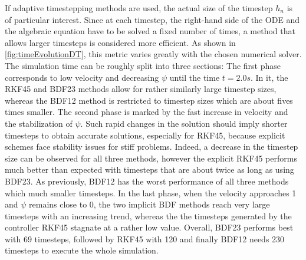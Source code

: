 \documentclass{report}
\begin{document}
If adaptive timestepping methods are used, the actual size of the timestep $h_n$ is of particular interest. Since at each timestep, the right-hand side of the ODE and the algebraic equation have to be solved a fixed number of times, a method that allows larger timesteps is considered more efficient. As shown in \autoref{fig:timeEvolutionDT}, this metric varies greatly with the chosen numerical solver. The simulation time can be roughly split into three sections: The first phase corresponds to low velocity and decreasing $\psi$ until the time $t=2.0s$. In it, the RKF45 and BDF23 methods allow for rather similarly large timestep sizes, whereas the BDF12 method is restricted to timestep sizes which are about fives times smaller. The second phase is marked by the fast increase in velocity and the stabilization of $\psi$. Such rapid changes in the solution should imply shorter timesteps to obtain accurate solutions, especially for RKF45, because explicit schemes face stability issues for stiff problems. Indeed, a decrease in the timestep size can be observed for all three methods, however the explicit RKF45 performs much better than expected with timesteps that are about twice as long as using BDF23. As previously, BDF12 has the worst performance of all three methods which much smaller timesteps. In the last phase, when the velocity approaches 1 and $\psi$ remains close to 0, the two implicit BDF methods reach very large timesteps with an increasing trend, whereas the the timesteps generated by the controller RKF45 stagnate at a rather low value. Overall, BDF23 performs best with 69 timesteps, followed by RKF45 with 120 and finally BDF12 needs 230 timesteps to execute the whole simulation. 
\end{document}
